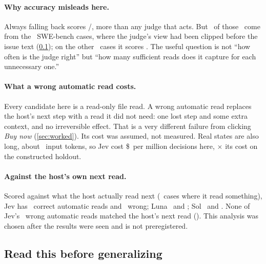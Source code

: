 \paragraph{Why accuracy misleads here.} Always falling back scores \TrAlwaysK/\TrN, more than any judge
that acts. But \TrAlwaysSThreeK\ of those \TrAlwaysK\ come from the \TrSThree\ SWE-bench cases, where the
judge's view had been clipped before the issue text (\cref{sec:caveats}); on the other \TrSOneTwo\ cases
it scores \TrAlwaysSOneTwoK. The useful question is not ``how often is the judge right'' but ``how many
sufficient reads does it capture for each unnecessary one.''

\paragraph{What a wrong automatic read costs.} Every candidate here is a read-only file read. A wrong
automatic read replaces the host's next step with a read it did not need: one lost step and some extra
context, and no irreversible effect. That is a very different failure from clicking \emph{Buy now}
(\cref{sec:worked}). Its cost was assumed, not measured. Real states are also long, about
\TrJevInputTokens\ input tokens, so Jev cost \$\TrJevCost\ per million decisions here, \TrJevCostXFirst$\times$
its cost on the constructed holdout.

\paragraph{Against the host's own next read.} Scored against what the host actually read next (\TrHostReadCases\
cases where it read something), Jev has \TrJevHostReads\ correct automatic reads and \TrJevHostWa\ wrong;
Luna \TrLunaHostReads\ and \TrLunaHostWa; Sol \TrSolHostReads\ and \TrSolHostWa. None of Jev's \TrJevWaK\
wrong automatic reads matched the host's next read (\TrJevWaMatchHost). This analysis was chosen after the
results were seen and is not preregistered.

\subsection{Read this before generalizing}\label{sec:caveats}

